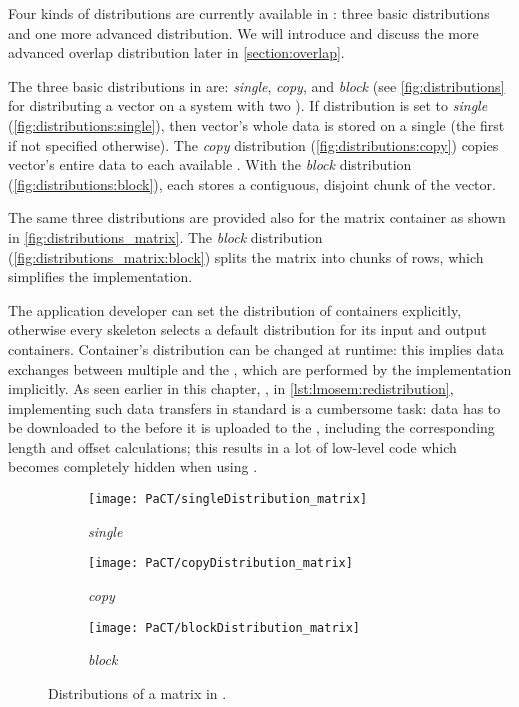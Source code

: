 Four kinds of distributions are currently available in \SkelCL:
three basic distributions and one more advanced distribution.
We will introduce and discuss the more advanced overlap distribution later in \autoref{section:overlap}.

The three basic distributions in \SkelCL are:
\emph{single}, \emph{copy}, and \emph{block} (see \autoref{fig:distributions} for distributing a vector on a system with two \GPUs).
If distribution is set to \emph{single} (\autoref{fig:distributions:single}), then vector's whole data is stored on a single \GPU (the first \GPU if not specified otherwise).
The \emph{copy} distribution (\autoref{fig:distributions:copy}) copies vector's entire data to each available \GPU.
With the \emph{block} distribution (\autoref{fig:distributions:block}), each \GPU stores a contiguous, disjoint chunk of the vector.

The same three distributions are provided also for the matrix container as shown in \autoref{fig:distributions_matrix}.
The \emph{block} distribution (\autoref{fig:distributions_matrix:block}) splits the matrix into chunks of rows, which simplifies the implementation.

The application developer can set the distribution of containers explicitly, otherwise every skeleton selects a default distribution for its input and output containers.
Container's distribution can be changed at runtime:
this implies data exchanges between multiple \GPUs and the \CPU, which are performed by the \SkelCL implementation implicitly.
As seen earlier in this chapter, \eg, in \autoref{lst:lmosem:redistribution}, implementing such data transfers in standard \OpenCL is a cumbersome task:
data has to be downloaded to the \CPU before it is uploaded to the \GPUs, including the corresponding length and offset calculations;
this results in a lot of low-level code which becomes completely hidden when using \SkelCL.

\begin{figure}[tbp]
  \centering
  \begin{subfigure}{.22\textwidth}
    \texttt{[image: PaCT/singleDistribution\_matrix]}
    \caption{\emph{single}}
    \label{fig:distributions_matrix:single}
  \end{subfigure}
  \hfill
  \begin{subfigure}{.22\textwidth}
    \texttt{[image: PaCT/copyDistribution\_matrix]}
    \caption{\emph{copy}}
    \label{fig:distributions_matrix:copy}
  \end{subfigure}
  \hfill
  \begin{subfigure}{.22\textwidth}
    \texttt{[image: PaCT/blockDistribution\_matrix]}
    \caption{\emph{block}}
    \label{fig:distributions_matrix:block}
  \end{subfigure}
  \caption{Distributions of a matrix in \SkelCL.}
  \label{fig:distributions_matrix}
\end{figure}

